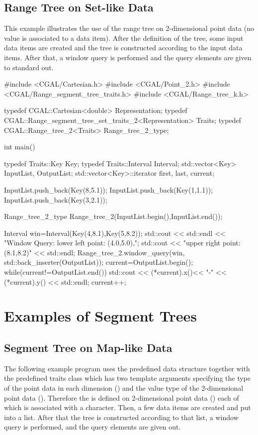 \subsection{Range Tree on Set-like Data}

This example illustrates the use of the range tree on
2-dimensional point data (no value is associated to a data item).
After the definition of the tree, some input data items are
created and the tree is constructed according to the input data
items.
After that, a window query is performed and the query elements
are given to standard out.

\begin{cprog}
#include <CGAL/Cartesian.h>
#include <CGAL/Point_2.h>
#include <CGAL/Range_segment_tree_traits.h>
#include <CGAL/Range_tree_k.h>

typedef CGAL::Cartesian<double> Representation;
typedef CGAL::Range_segment_tree_set_traits_2<Representation> Traits;
typedef CGAL::Range_tree_2<Traits> Range_tree_2_type;

int main()
{
  typedef Traits::Key Key;
  typedef Traits::Interval Interval;
  std::vector<Key> InputList, OutputList;
  std::vector<Key>::iterator first, last, current;

  InputList.push_back(Key(8,5.1));
  InputList.push_back(Key(1,1.1));
  InputList.push_back(Key(3,2.1));

  Range_tree_2_type Range_tree_2(InputList.begin(),InputList.end());

  Interval win=Interval(Key(4,8.1),Key(5,8.2));
  std::cout << std::endl << "Window Query: lower left point: (4.0,5.0),";
  std::cout << "upper right point: (8.1,8.2)" << std::endl;
  Range_tree_2.window_query(win, std::back_inserter(OutputList));
  current=OutputList.begin();
  while(current!=OutputList.end()){
    std::cout << (*current).x()<< "-" << (*current).y() << std::endl;
    current++;
  }
}
\end{cprog}

\section{Examples of Segment Trees}
\label{User:RangeSegment:User:Segment}
\subsection{Segment Tree on Map-like Data}

The following example program uses the predefined  data structure together with the predefined traits
  class  which has two template arguments
  specifying the
  type of the point data in each dimension
  () and the value type of the
  2-dimensional point data (). Therefore the  is defined on 2-dimensional point data
  () each of which is
  associated with a character.
Then, a few data items are created and put into a list. After
  that the tree is constructed according to that list, a window
  query is performed, and the query elements are given out.



